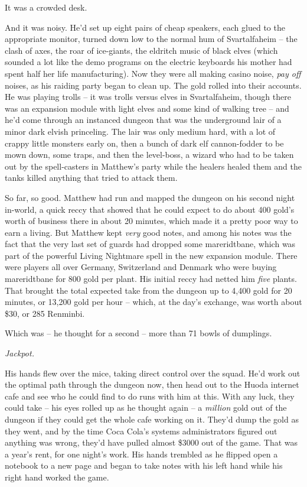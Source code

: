 It was a crowded desk.

And it was noisy. He'd set up eight pairs of cheap speakers, each
glued to the appropriate monitor, turned down low to the normal hum
of Svartalfaheim -- the clash of axes, the roar of ice-giants, the
eldritch music of black elves (which sounded a lot like the demo
programs on the electric keyboards his mother had spent half her
life manufacturing). Now they were all making casino noise,
\emph{pay off} noises, as his raiding party began to clean up. The
gold rolled into their accounts. He was playing trolls -- it was
trolls versus elves in Svartalfaheim, though there was an expansion
module with light elves and some kind of walking tree -- and he'd
come through an instanced dungeon that was the underground lair of
a minor dark elvish princeling. The lair was only medium hard, with
a lot of crappy little monsters early on, then a bunch of dark elf
cannon-fodder to be mown down, some traps, and then the level-boss,
a wizard who had to be taken out by the spell-casters in Matthew's
party while the healers healed them and the tanks killed anything
that tried to attack them.

So far, so good. Matthew had run and mapped the dungeon on his
second night in-world, a quick reccy that showed that he could
expect to do about 400 gold's worth of business there in about 20
minutes, which made it a pretty poor way to earn a living. But
Matthew kept \emph{very} good notes, and among his notes was the
fact that the very last set of guards had dropped some
mareridtbane, which was part of the powerful Living Nightmare spell
in the new expansion module. There were players all over Germany,
Switzerland and Denmark who were buying mareridtbane for 800 gold
per plant. His initial reccy had netted him \emph{five} plants.
That brought the total expected take from the dungeon up to 4,400
gold for 20 minutes, or 13,200 gold per hour -- which, at the day's
exchange, was worth about \$30, or 285 Renminbi.

Which was -- he thought for a second -- more than 71 bowls of
dumplings.

\emph{Jackpot.}

His hands flew over the mice, taking direct control over the squad.
He'd work out the optimal path through the dungeon now, then head
out to the Huoda internet cafe and see who he could find to do runs
with him at this. With any luck, they could take -- his eyes rolled
up as he thought again -- a \emph{million} gold out of the dungeon
if they could get the whole cafe working on it. They'd dump the
gold as they went, and by the time Coca Cola's systems
administrators figured out anything was wrong, they'd have pulled
almost \$3000 out of the game. That was a year's rent, for one
night's work. His hands trembled as he flipped open a notebook to a
new page and began to take notes with his left hand while his right
hand worked the game.

